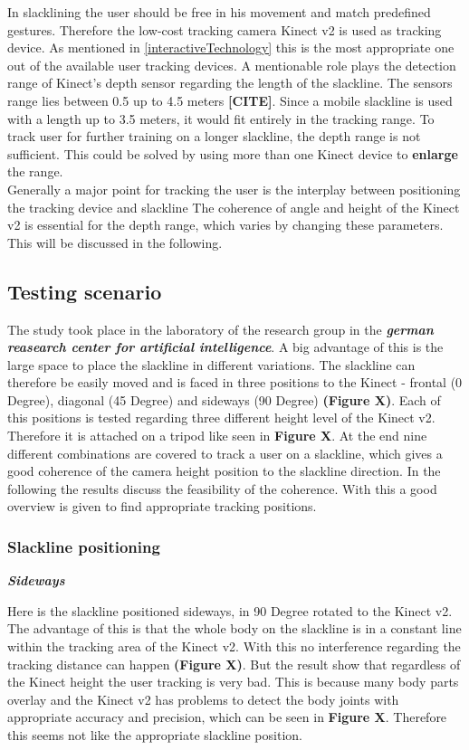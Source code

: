 In slacklining the user should be free in his movement and match predefined gestures. Therefore the low-cost tracking camera Kinect v2 is used as tracking device. As mentioned in \ref{interactiveTechnology} this is the most appropriate one out of the available user tracking devices.
A mentionable role plays the detection range of Kinect’s depth sensor regarding the length of the slackline. The sensors range lies between 0.5 up to 4.5 meters \textbf{[CITE]}. Since a mobile slackline is used with a length up to 3.5 meters, it would fit entirely in the tracking range. To track user for further training on a longer slackline, the depth range is not sufficient. This could be solved by using more than one Kinect device to \textbf{enlarge} the range. 
\\
Generally a major point for tracking the user is the interplay between positioning the tracking device and slackline The coherence of angle and height of the Kinect v2 is essential for the depth range, which varies by changing these parameters. This will be discussed in the following.

\subsection{Testing scenario}

The study took place in the laboratory of the research group in the \textit{\textbf{german reasearch center for artificial intelligence}}. A big advantage of this is the large space to place the slackline in different variations. The slackline can therefore be easily moved and is faced in three positions to the Kinect - frontal (0 Degree), diagonal (45 Degree) and sideways (90 Degree) \textbf{(Figure X)}. Each of this positions is tested regarding three different height level of the Kinect v2. Therefore it is attached on a tripod like seen in \textbf{Figure X}. At the end nine different combinations are covered to track a user on a slackline, which gives a good coherence of the camera height position to the slackline direction. In the following the results discuss the feasibility of the coherence. With this a good overview is given to find appropriate tracking positions.

\subsubsection{Slackline positioning}
\textit{\textbf{Sideways}}


Here is the slackline positioned sideways, in 90 Degree rotated to the Kinect v2. The advantage of this is that the whole body on the slackline is in a constant line within the tracking area of the Kinect v2. With this no interference regarding the tracking distance can happen \textbf{(Figure X)}. But the result show that regardless of the Kinect height the user tracking is very bad. This is because many body parts overlay and the Kinect v2 has problems to detect the body joints with appropriate accuracy and precision, which can be seen in \textbf{Figure X}. Therefore this seems not like the appropriate slackline position.


